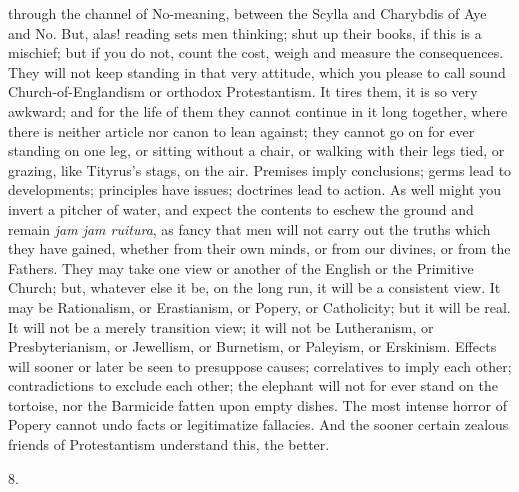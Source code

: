through the channel of No-meaning, between the Scylla and Charybdis of
Aye and No. But, alas! reading sets men thinking; shut up their books,
if this is a mischief; but if you do not, count the cost, weigh and
measure the consequences. They will not keep standing in that very
attitude, which you please to call sound Church-of-Englandism or
orthodox Protestantism. It tires them, it is so very awkward; and for
the life of them they cannot continue in it long together, where there
is neither article nor canon to lean against; they cannot go on for
ever standing on one leg, or sitting without a chair, or walking with
their legs tied, or grazing, like Tityrus's stags, on the air.
Premises imply conclusions; germs lead to developments; principles
have issues; doctrines lead to action. As well might you invert
a pitcher of water, and expect the contents to eschew the ground and
remain \emph{jam jam ruitura}, as fancy that men will not carry out
the truths which they have gained, whether from their own minds, or
from our divines, or from the Fathers. They may take one view or
another of the English or the Primitive Church; but, whatever else it
be, on the long run, it will be a consistent view. It may be
Rationalism, or Erastianism, or Popery, or Catholicity; but it will be
real. It will not be a merely transition view; it will not be
Lutheranism, or Presbyterianism, or Jewellism, or Burnetism, or
Paleyism, or Erskinism. Effects will sooner or later be seen to
presuppose causes; correlatives to imply each other; contradictions to
exclude each other; the elephant will not for ever stand on the
tortoise, nor the Barmicide fatten upon empty dishes. The most intense
horror of Popery cannot undo facts or legitimatize fallacies. And the
sooner certain zealous friends of Protestantism understand this, the
better.

8.

